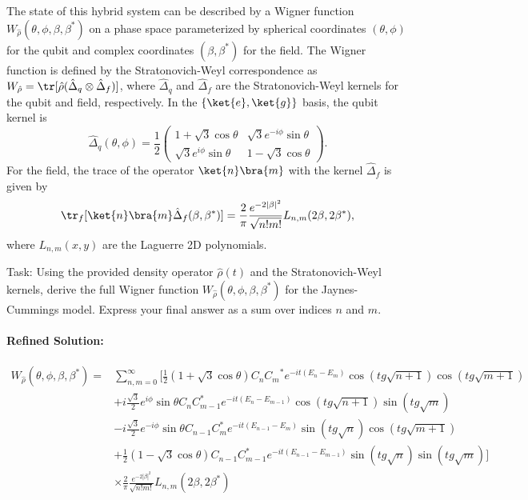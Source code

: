 \documentclass[10pt]{article}
\begin{document}
The state of this hybrid system can be described by a Wigner function $W_{\hat{\rho}}(\theta, \phi, \beta, \beta^*)$ on a phase space parameterized by spherical coordinates $(\theta, \phi)$ for the qubit and complex coordinates $(\beta, \beta^*)$ for the field. The Wigner function is defined by the Stratonovich-Weyl correspondence as $W_{\hat{\rho}} = \tr[\hat{\rho} (\hat{\Delta}_q \otimes \hat{\Delta}_f)]$, where $\hat{\Delta}_q$ and $\hat{\Delta}_f$ are the Stratonovich-Weyl kernels for the qubit and field, respectively. In the $\{\ket{e}, \ket{g}\}$ basis, the qubit kernel is
$$
\hat{\Delta}_q(\theta,\phi) = \frac{1}{2}\left(
\begin{array}{cc}
	1+\sqrt{3}\cos{\theta} & \sqrt{3}e^{-i\phi}\sin{\theta} \\
	\sqrt{3}e^{i\phi}\sin{\theta} & 1-\sqrt{3}\cos{\theta} 
\end{array}
\right).
$$
For the field, the trace of the operator $\ket{n}\bra{m}$ with the kernel $\hat{\Delta}_f$ is given by
$$
\tr_f[\ket{n}\bra{m} \hat{\Delta}_f(\beta, \beta^*)] = \frac{2}{\pi}\frac{e^{-2|\beta|^{2}}}{\sqrt{n!m!}}L_{n,m}(2\beta,2\beta^{*}),
$$
where $L_{n,m}(x, y)$ are the Laguerre 2D polynomials.

Task:
Using the provided density operator $\hat{\rho}(t)$ and the Stratonovich-Weyl kernels, derive the full Wigner function $W_{\hat{\rho}}(\theta, \phi, \beta, \beta^*)$ for the Jaynes-Cummings model. Express your final answer as a sum over indices $n$ and $m$.

\paragraph*{Refined Solution:}
\[ \begin{aligned}
W_{\hat{\rho}}(\theta, \phi, \beta,\beta^{*}) = & \sum_{n,m=0}^{\infty}\Big[\frac{1}{2}(1+\sqrt{3}\cos\theta) C_n{C_m}^{*} {e^{-it(E_n-E_m)}}\cos(tg\sqrt{n+1})\cos(tg\sqrt{m+1}) \\
& +i\frac{\sqrt{3}}{2}e^{i\phi}\sin\theta C_n C_{m-1}^{*}{e^{-it(E_n-E_{m-1})}}\cos(tg\sqrt{n+1})\sin(tg\sqrt{m}) \\
& -i\frac{\sqrt{3}}{2}e^{-i\phi}\sin\theta C_{n-1}C_m^{*} {e^{-it(E_{n-1}-E_m)}}\sin(tg\sqrt{n})\cos(tg\sqrt{m+1}) \\
& +\frac{1}{2}(1-\sqrt{3}\cos\theta) C_{n-1}C_{m-1}^{*} {e^{-it(E_{n-1}-E_{m-1})}}\sin(tg\sqrt{n})\sin(tg\sqrt{m})\Big] \\
& \times \frac{2}{\pi}\frac{e^{-2|\beta|^{2}}}{\sqrt{n!m!}}L_{n,m}(2\beta,2\beta^{*})
\end{aligned} \]
\end{document}

